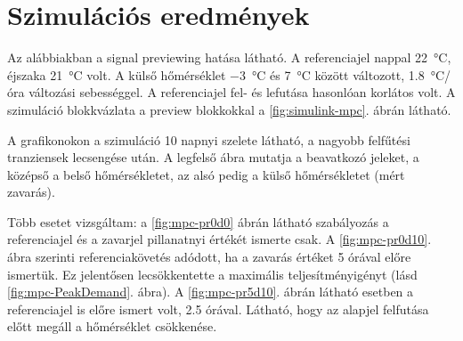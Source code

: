 %		

\chapter{Szimulációs eredmények}

Az alábbiakban a signal previewing hatása látható. A referenciajel nappal \SI{22}{\celsius}, éjszaka \SI{21}{\celsius} volt. A külső hőmérséklet \SI{-3}{\celsius} és \SI{7}{\celsius} között változott, \SI{1.8}{\celsius}/óra változási sebességgel. A referenciajel fel- és lefutása hasonlóan korlátos volt. A szimuláció blokkvázlata a preview blokkokkal a \ref{fig:simulink-mpc}. ábrán látható.

A grafikonokon a szimuláció 10 napnyi szelete látható, a nagyobb felfűtési tranziensek lecsengése után. A legfelső ábra mutatja a  beavatkozó  jeleket, a középső a belső hőmérsékletet, az alsó pedig a külső hőmérsékletet (mért zavarás).

Több esetet vizsgáltam: a \ref{fig:mpc-pr0d0} ábrán látható szabályozás a referenciajel és a zavarjel pillanatnyi értékét ismerte csak. A \ref{fig:mpc-pr0d10}. ábra szerinti referenciakövetés adódott, ha a zavarás értéket 5 órával előre ismertük. Ez jelentősen lecsökkentette a maximális teljesítményigényt (lásd \ref{fig:mpc-PeakDemand}. ábra). A \ref{fig:mpc-pr5d10}. ábrán látható esetben a referenciajel is előre ismert volt, 2.5 órával. Látható, hogy az alapjel felfutása előtt megáll a hőmérséklet csökkenése.


